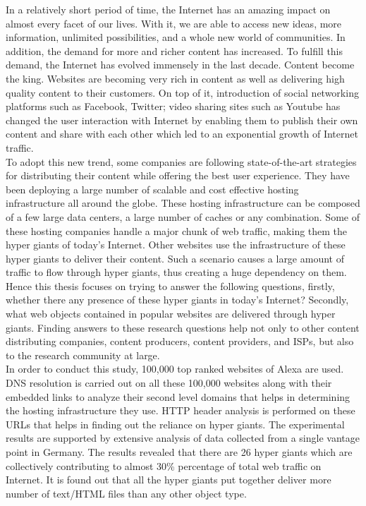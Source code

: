 \noindent In a relatively short period of time, the Internet has an amazing impact on almost every facet of our lives. With it, we are able to access new ideas, more information, unlimited possibilities, and a whole new world of communities. In addition, the demand for more and richer content has increased. To fulfill this demand, the Internet has evolved immensely in the last decade. Content become the king. Websites are becoming very rich in content as well as delivering high quality content to their customers. On top of it, introduction of social networking platforms such as Facebook, Twitter; video sharing sites such as Youtube has changed the user interaction with Internet by enabling them to publish their own content and share with each other which led to an exponential growth of Internet traffic. \\

\noindent To adopt this new trend, some companies are following state-of-the-art strategies for distributing their content while offering the best user experience. They have been deploying a large number of scalable and cost effective hosting infrastructure all around the globe. These hosting infrastructure can be composed of a few large data centers, a large number of caches or any combination. Some of these hosting companies handle a major chunk of web traffic, making them the hyper giants of today's Internet. Other websites use the infrastructure of these hyper giants to deliver their content. Such a scenario causes a large amount of traffic to flow through hyper giants, thus creating a huge dependency on them. Hence this thesis focuses on trying to answer the following questions, firstly, whether there any presence of these hyper giants in today's Internet? Secondly, what web objects contained in popular websites are delivered through hyper giants. Finding answers to these research questions help not only to other content distributing companies, content producers, content providers, and ISPs, but also to the research community at large. \\

\noindent In order to conduct this study, 100,000 top ranked websites of Alexa are used. DNS resolution is carried out on all these 100,000 websites along with their embedded links to analyze their second level domains that helps in determining the hosting infrastructure they use. HTTP header analysis is performed on these URLs that helps in finding out the reliance on hyper giants. The experimental results are supported by extensive analysis of data collected from a single vantage point in Germany. The results revealed that there are 26 hyper giants which are collectively contributing to almost 30\% percentage of total web traffic on Internet. It is found out that all the hyper giants put together deliver more number of text/HTML files than any other object type.




